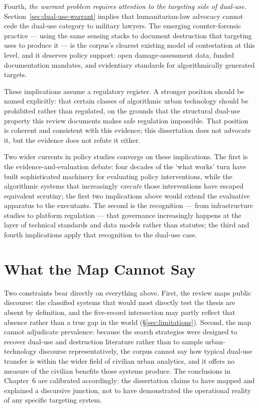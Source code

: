Fourth, \textit{the warrant problem requires attention to the targeting side of dual-use}. Section~\ref{sec:dual-use-warrant} implies that humanitarian-law advocacy cannot cede the dual-use category to military lawyers. The emerging counter-forensic practice — using the same sensing stacks to document destruction that targeting uses to produce it \parencite{holail2024} — is the corpus's clearest existing model of contestation at this level, and it deserves policy support: open damage-assessment data, funded documentation mandates, and evidentiary standards for algorithmically generated targets.

These implications assume a regulatory register. A stronger position should be named explicitly: that certain classes of algorithmic urban technology should be prohibited rather than regulated, on the grounds that the structural dual-use property this review documents makes safe regulation impossible. That position is coherent and consistent with this evidence; this dissertation does not advocate it, but the evidence does not refute it either.

Two wider currents in policy studies converge on these implications. The first is the evidence-and-evaluation debate: four decades of the `what works' turn \parencite{tranfield2003} have built sophisticated machinery for evaluating policy interventions, while the algorithmic systems that increasingly \emph{execute} those interventions have escaped equivalent scrutiny; the first two implications above would extend the evaluative apparatus to the executants. The second is the recognition — from infrastructure studies to platform regulation — that governance increasingly happens at the layer of technical standards and data models rather than statutes; the third and fourth implications apply that recognition to the dual-use case.

\section{What the Map Cannot Say}
\label{sec:map-cannot-say}

Two constraints bear directly on everything above. First, the review maps public discourse: the classified systems that would most directly test the thesis are absent by definition, and the five-record intersection may partly reflect that absence rather than a true gap in the world (§\ref{sec:limitations}). Second, the map cannot adjudicate prevalence: because the search strategies were designed to recover dual-use and destruction literature rather than to sample urban-technology discourse representatively, the corpus cannot say how typical dual-use transfer is within the wider field of civilian urban analytics, and it offers no measure of the civilian benefits those systems produce. The conclusions in Chapter~6 are calibrated accordingly: the dissertation claims to have mapped and explained a discursive junction, not to have demonstrated the operational reality of any specific targeting system.
